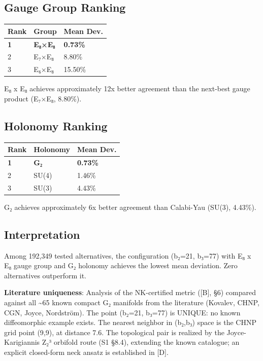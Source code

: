 \documentclass[11pt,a4paper]{article}
\begin{document}
\subsection{Gauge Group Ranking}\label{gauge-group-ranking}

\begin{longtable}[]{@{}lll@{}}
\toprule\noalign{}
Rank & Group & Mean Dev. \\
\midrule\noalign{}
\endhead
\bottomrule\noalign{}
\endlastfoot
\textbf{1} & \textbf{E₈×E₈} & \textbf{0.73\%} \\
2 & E₇×E₈ & 8.80\% \\
3 & E₆×E₈ & 15.50\% \\
\end{longtable}

E₈ x E₈ achieves approximately 12x better agreement than the next-best gauge product (E₇×E₈, 8.80\%).

\subsection{Holonomy Ranking}\label{holonomy-ranking}

\begin{longtable}[]{@{}lll@{}}
\toprule\noalign{}
Rank & Holonomy & Mean Dev. \\
\midrule\noalign{}
\endhead
\bottomrule\noalign{}
\endlastfoot
\textbf{1} & \textbf{G₂} & \textbf{0.73\%} \\
2 & SU(4) & 1.46\% \\
3 & SU(3) & 4.43\% \\
\end{longtable}

G₂ achieves approximately 6x better agreement than Calabi-Yau (SU(3), 4.43\%).

\subsection{Interpretation}\label{interpretation-1}

Among 192,349 tested alternatives, the configuration (b₂=21, b₃=77) with E₈ x E₈ gauge group and G₂ holonomy achieves the lowest mean deviation. Zero alternatives outperform it.

\textbf{Literature uniqueness}: Analysis of the NK-certified metric ({[}B{]}, §6) compared against all \textasciitilde65 known compact G₂ manifolds from the literature (Kovalev, CHNP, CGN, Joyce, Nordström). The point (b₂=21, b₃=77) is UNIQUE: no known diffeomorphic example exists. The nearest neighbor in (b₂,b₃) space is the CHNP grid point (9,9), at distance 7.6. The topological pair is realized by the Joyce-Karigiannis Z₂³ orbifold route (S1 §8.4), extending the known catalogue; an explicit closed-form neck ansatz is established in {[}D{]}.
\end{document}
